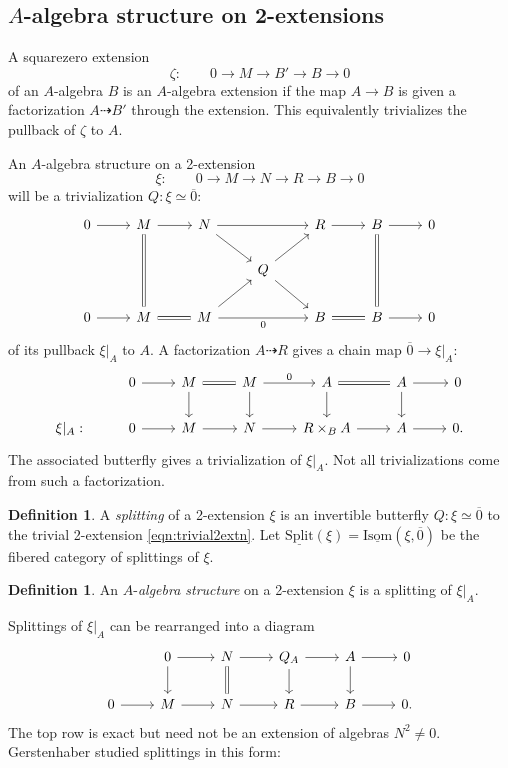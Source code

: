 \documentclass[11pt,reqno]{amsart}
\theoremstyle{definition}
\newtheorem{definition}[theorem]{Definition}
\newcommand{\IIsom}{\underline{\textrm{Isom}}}
\newcommand{\Split}{\underline{\textrm{Split}}}
\renewcommand{\bar}[1]{\overline{#1}}
\begin{document}
\subsection{$A$-algebra structure on 2-extensions}\label{ss:algstr}

A squarezero extension 
\[\zeta : \qquad 0 \to M \to B' \to B \to 0\]
of an $A$-algebra $B$ is an $A$-algebra extension if the map $A \to B$ is given a factorization $A \dashrightarrow B'$ through the extension. This equivalently trivializes the pullback of $\zeta$ to $A$. 

An $A$-algebra structure on a 2-extension 
\[\xi : \qquad 0 \to M \to N \to R \to B \to 0\] 
will be a trivialization $Q : \xi \simeq \bar 0$:
\[\begin{tikzcd}
0 \ar[r] &M \ar[r] \ar[dd, equals] &N \ar[rr] \ar[dr] &&R \ar[r] &B \ar[r] \ar[dd, equals] &0        \\
 &&&Q \ar[ur] \ar[dr] \\
0 \ar[r] &M \ar[r, equals]  &M \ar[rr, "0", swap] \ar[ur]  &&B \ar[r, equals] &B \ar[r] &0
\end{tikzcd}\]    
of its pullback $\xi|_A$ to $A$. A factorization $A \dashrightarrow R$ gives a chain map $\bar 0 \to \xi|_A$:
\[\begin{tikzcd}
 &0  \ar[r] &M  \ar[r, equals] \ar[d]  &M \ar[r, "0"] \ar[d]  &A   \ar[d]\ar[r, equals] &A   \ar[d]\ar[r] &0 \\
\xi|_A : &0 \ar[r]  &M \ar[r]  &N  \ar[r] &R \times_B A  \ar[r] &A \ar[r] &0.
\end{tikzcd}\]
The associated butterfly gives a trivialization of $\xi|_A$. Not all trivializations come from such a factorization. 

\begin{definition}
A \textit{splitting} of a 2-extension $\xi$ is an invertible butterfly $Q : \xi \simeq \bar 0$ to the trivial 2-extension \eqref{eqn:trivial2extn}. Let $\Split(\xi) = \IIsom(\xi, \overline{0})$ be the fibered category of splittings of $\xi$.
\end{definition}


\begin{definition}
An $A$-\emph{algebra structure} on a 2-extension $\xi$ is a splitting of $\xi|_A$. 
\end{definition}

Splittings of $\xi|_A$ can be rearranged into a diagram
\begin{equation}\label{eqn:Aalg2extn}
\begin{tikzcd}
 &0 \ar[r] \ar[d] &N \ar[r] \ar[d, equals] &Q_A \ar[r] \ar[d] &A \ar[r] \ar[d] &0 \\
0 \ar[r] &M \ar[r] &N \ar[r] &R \ar[r] &B \ar[r] &0.
\end{tikzcd}    
\end{equation}
The top row is exact but need not be an extension of algebras $N^2 \neq 0$. Gerstenhaber studied splittings in this form:
\end{document}
